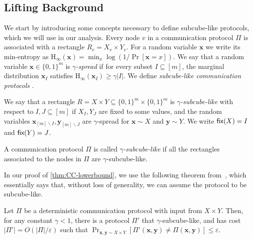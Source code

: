 \documentclass[10pt,a4paper]{article}
\theoremstyle{definition}
\theoremstyle{remark}
\theoremstyle{example}
\theoremstyle{plain}
\renewcommand{\setminus}{\smallsetminus}
\renewcommand{\epsilon}{\varepsilon}
\newcommand{\fix}{\textsf{\upshape fix}}
\newcommand{\Hmin}{\mathrm{H}_{\infty}}
\newcommand{\xbf}{\bm{x}}
\newcommand{\protocolPi}{\Pi}
\newcommand{\protocolPiAlt}{\Pi'}
\newcommand{\Hminof}[1]{\Hmin( {#1} )}
\newcommand{\commCost}[1]{\lvert#1\rvert}
\newcommand{\setsize}[1]{\lvert#1\rvert}
\begin{document}
\subsection{Lifting Background}
 We start by introducing some concepts necessary to define subcube-like protocols, which we will use in our analysis.
Every node $v$ in a communication protocol $\protocolPi$ is associated with a rectangle $R_v = X_v \times Y_v$. 
For a random variable $\xbf$ we write its min-entropy as $\Hminof{\xbf}=\min_x \log (1/\Pr[\xbf = x])$. We say that a random variable $\xbf \in \{0,1\}^m$ is \emph{$\gamma$-spread} 
if for every subset $I\subseteq [m]$, the marginal distribution $\xbf_I$ satisfies $\Hminof{\xbf_I}\geq \gamma \setsize{I}$. We define \emph{subcube-like communication protocols} \cite{GoosGJL2025quantum,RiazanovSSY2025searching}.

\begin{definition}
    We say that a rectangle $R=X\times Y \subseteq \{0,1\}^m \times \{0,1\}^m$ is \emph{$\gamma$-subcube-like} with respect to $I,J \subseteq [m]$ if $X_I, Y_J$ are fixed to some values, and the random variables $\bm x_{[m]\setminus I},\bm y_{[m]\setminus J}$ are $\gamma$-spread for $\bm x \sim X$ and $\bm y \sim Y$. We write $\fix (X)=I$ and $\fix (Y)=J$.

    A communication protocol $\protocolPi$ is called \emph{$\gamma$-subcube-like} if all the rectangles associated to the nodes in $\protocolPi$ are $\gamma$-subcube-like.
\end{definition}

In our proof of \cref{thm:CC-lowerbound}, we use the following theorem from~\cite{GoosGJL2025quantum}, which essentially says that, without loss of generality, we can assume the protocol to be subcube-like. 

\begin{theorem}\label{thm:ggjl-cleanup}
Let $\protocolPi$ be a deterministic communication protocol with input from $X \times Y$. Then, for any constant $\gamma<1$, there is a protocol $\protocolPiAlt$ that  $\gamma$-subcube-like, and has cost $\commCost{\protocolPiAlt}=O(\commCost{\protocolPi}/\epsilon)$ such that $\Pr_{\bm x, \bm y \sim X \times Y}[\protocolPiAlt(\bm x, \bm y) \neq \protocolPi(\bm x, \bm y)] \le \epsilon$. 
\end{theorem}
\end{document}
